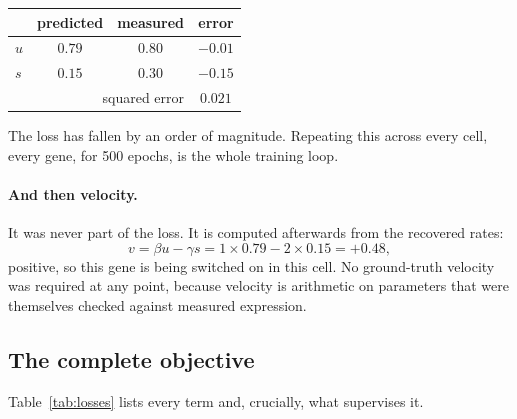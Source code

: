 \documentclass[11pt,a4paper]{article}
\newcommand{\uns}{u}
\newcommand{\spl}{s}
\theoremstyle{definition}
\begin{document}
\begin{center}
\begin{tabular}{@{}lccc@{}}
\toprule
 & predicted & measured & error \\
\midrule
$\uns$ & $0.79$ & $0.80$ & $-0.01$ \\
$\spl$ & $0.15$ & $0.30$ & $-0.15$ \\
\midrule
\multicolumn{3}{r}{squared error} & $\mathbf{0.021}$ \\
\bottomrule
\end{tabular}
\end{center}

The loss has fallen by an order of magnitude. Repeating this across every cell,
every gene, for 500 epochs, is the whole training loop.

\paragraph{And then velocity.} It was never part of the loss. It is computed
afterwards from the recovered rates:
%
\begin{equation}
v = \beta \uns - \gamma \spl = 1 \times 0.79 - 2 \times 0.15 = +0.48,
\end{equation}
%
positive, so this gene is being switched on in this cell. No ground-truth
velocity was required at any point, because velocity is arithmetic on
parameters that were themselves checked against measured expression.

\subsection{The complete objective}

Table~\ref{tab:losses} lists every term and, crucially, what supervises it.
\end{document}
